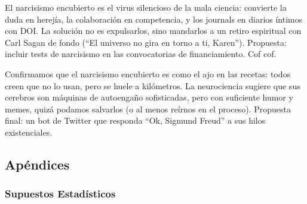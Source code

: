 \documentclass[
  10pt]{article}
\begin{document}
El narcisismo encubierto es el virus silencioso de la mala ciencia:
convierte la duda en herejía, la colaboración en competencia, y los
journals en diarios íntimos con DOI. La solución no es expulsarlos, sino
mandarlos a un retiro espiritual con Carl Sagan de fondo (``El universo
no gira en torno a ti, Karen''). Propuesta: incluir tests de narcisismo
en las convocatorias de financiamiento. Cof cof.

Confirmamos que el narcisismo encubierto es como el ajo en las recetas:
todos creen que no lo usan, pero se huele a kilómetros. La neurociencia
sugiere que sus cerebros son máquinas de autoengaño sofisticadas, pero
con suficiente humor y memes, quizá podamos salvarlos (o al menos
reírnos en el proceso). Propuesta final: un bot de Twitter que responda
``Ok, Sigmund Freud'' a sus hilos existenciales.

\subsection{Apéndices}\label{apuxe9ndices}

\subsubsection{Supuestos Estadísticos}\label{supuestos-estaduxedsticos}
\end{document}
